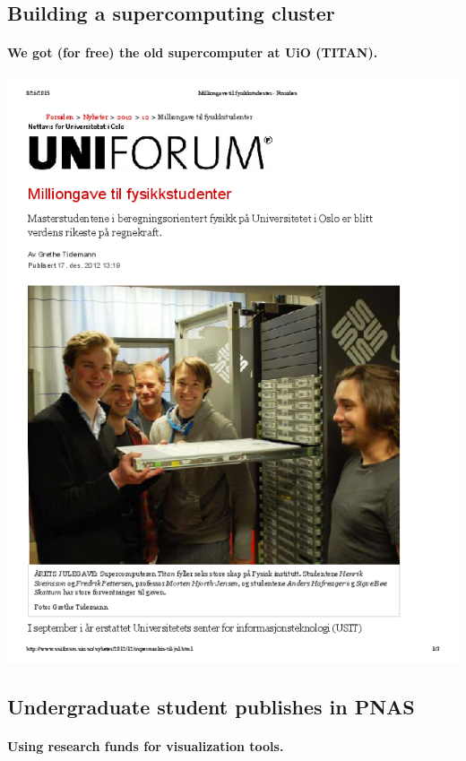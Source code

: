 \documentclass[%
twoside,                 %
final,                   %
10pt]{article}
\begin{document}
\subsection*{Building a supercomputing cluster}

\paragraph{We got (for free) the old supercomputer at UiO (TITAN).}


\centerline{\includegraphics[width=0.7\linewidth]{fig-future/uniforum-0.png}}




\subsection*{Undergraduate student publishes in PNAS}

\paragraph{Using research funds for visualization tools.}
\end{document}
